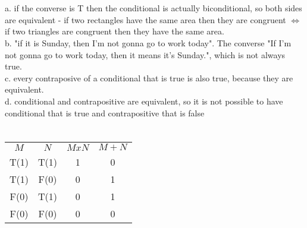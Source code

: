 \documentclass{article}
\begin{document}
\section{}
a. if the converse is T then the conditional is actually biconditional, so both sides are equivalent - if two rectangles have the same area then they are congruent $\Leftrightarrow$ if two triangles are congruent then they have the same area.\\
b. "if it is Sunday, then I'm not gonna go to work today". The converse "If I'm not gonna go to work today, then it means it's Sunday.", which is not always true.\\
c. every contraposive of a conditional that is true is also true, because they are equivalent. \\
d. conditional and contrapositive are equivalent, so it is not possible to have conditional that is true and contrapositive that is false \\

\section{}

\begin{tabular}{ c c c c }
  $M$  & $N$  & $M x N$ & $M + N$ \\
  T(1) & T(1) & 1       & 0       \\
  T(1) & F(0) & 0       & 1       \\
  F(0) & T(1) & 0       & 1       \\
  F(0) & F(0) & 0       & 0       \\
\end{tabular} \\
\end{document}
